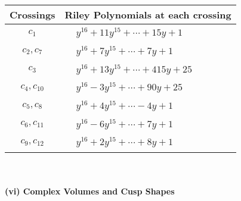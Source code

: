 \documentclass[1p]{elsarticle_modified}
\theoremstyle{definition}
\begin{document}
\begin{tabular}{m{50pt}|m{274pt}}
Crossings & \hspace{64pt}Riley Polynomials at each crossing \\
\hline $$\begin{aligned}c_{1}\end{aligned}$$&$\begin{aligned}
&y^{16}+11 y^{15}+\cdots+15 y+1
\end{aligned}$\\
\hline $$\begin{aligned}c_{2},c_{7}\end{aligned}$$&$\begin{aligned}
&y^{16}+7 y^{15}+\cdots+7 y+1
\end{aligned}$\\
\hline $$\begin{aligned}c_{3}\end{aligned}$$&$\begin{aligned}
&y^{16}+13 y^{15}+\cdots+415 y+25
\end{aligned}$\\
\hline $$\begin{aligned}c_{4},c_{10}\end{aligned}$$&$\begin{aligned}
&y^{16}-3 y^{15}+\cdots+90 y+25
\end{aligned}$\\
\hline $$\begin{aligned}c_{5},c_{8}\end{aligned}$$&$\begin{aligned}
&y^{16}+4 y^{15}+\cdots-4 y+1
\end{aligned}$\\
\hline $$\begin{aligned}c_{6},c_{11}\end{aligned}$$&$\begin{aligned}
&y^{16}-6 y^{15}+\cdots+7 y+1
\end{aligned}$\\
\hline $$\begin{aligned}c_{9},c_{12}\end{aligned}$$&$\begin{aligned}
&y^{16}+2 y^{15}+\cdots+8 y+1
\end{aligned}$\\
\hline
\end{tabular}\\~\\
\newpage\flushleft \textbf{(vi) Complex Volumes and Cusp Shapes}
\end{document}
